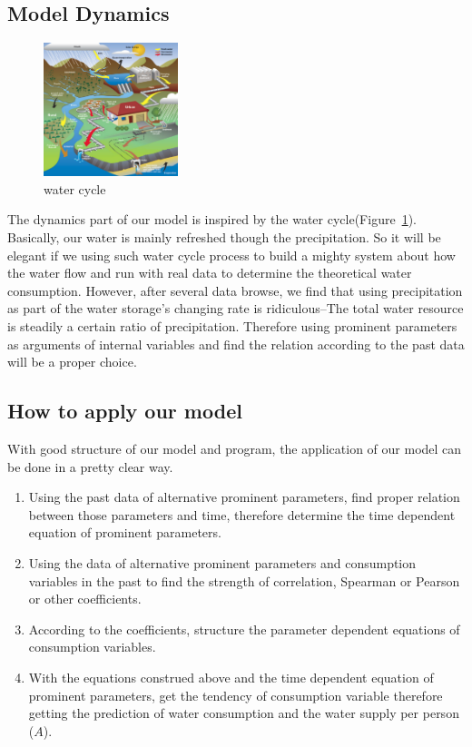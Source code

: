   \subsection{Model Dynamics}

    \begin{figure}
    \includegraphics[width = 0.35\textwidth]{picture/UrbanWaterCycle.jpg}
    \caption{water cycle\cite{WaterCycle}}
    \label{water cycle}
    \end{figure}
    The dynamics part of our model is inspired by the water cycle(Figure~\ref{water cycle}). Basically, our water is mainly refreshed though the precipitation. So it will be elegant if we using such water cycle process to build a mighty system about how the water flow and run with real data to determine the theoretical water consumption. However, after several data browse, we find that using precipitation as part of the water storage's changing rate is ridiculous--The total water resource is steadily a certain ratio of precipitation. Therefore using prominent parameters as arguments of internal variables and find the relation according to the past data will be a proper choice.

  \subsection{How to apply our model}

    With good structure of our model and program, the application of our model can be done in a pretty clear way.

    \begin{enumerate}
      \item Using the past data of alternative prominent parameters, find proper relation between those parameters and time, therefore determine the time dependent equation of prominent parameters.
      \item Using the data of alternative prominent parameters and consumption variables in the past to find the strength of correlation, Spearman or Pearson or other coefficients.
      \item According to the coefficients, structure the parameter dependent equations of consumption variables.
      \item With the equations construed above and the time dependent equation of prominent parameters, get the tendency of consumption variable therefore getting the prediction of water consumption and the water supply per person ($A$).
    \end{enumerate}



